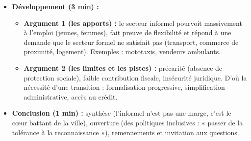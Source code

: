 \documentclass[11pt]{article}
\begin{document}
\begin{exoresolu}
\begin{enumerate}
\begin{itemize}
        \item \textbf{Développement (3 min) :}
        \begin{itemize}
            \item \textbf{Argument 1 (les apports) :} le secteur informel pourvoit massivement à l'emploi (jeunes, femmes), fait preuve de flexibilité et répond à une demande que le secteur formel ne satisfait pas (transport, commerce de proximité, logement). Exemples : mototaxis, vendeurs ambulants.
            \item \textbf{Argument 2 (les limites et les pistes) :} précarité (absence de protection sociale), faible contribution fiscale, insécurité juridique. D'où la nécessité d'une transition : formalisation progressive, simplification administrative, accès au crédit.
        \end{itemize}
        \item \textbf{Conclusion (1 min) :} synthèse (l'informel n'est pas une marge, c'est le cœur battant de la ville), ouverture (des politiques inclusives : « passer de la tolérance à la reconnaissance »), remerciements et invitation aux questions.
    \end{itemize}
\end{enumerate}
\end{exoresolu}
\end{document}
